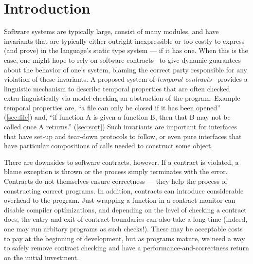 \section{Introduction}

Software systems are typically large, consist of many modules, and have invariants that are typically either outright inexpressible or too costly to express (and prove) in the language's static type system --- if it has one.
%
When this is the case, one might hope to rely on software contracts~\cite{dvanhorn:Findler2002Contracts} to give dynamic guarantees about the behavior of one's system, blaming the correct party responsible for any violation of these invariants.
%
A proposed system of \emph{temporal contracts}~\citep{ianjohnson:dfm:icfp2011} provides a linguistic mechanism to describe temporal properties that are often checked extra-linguistically via model-checking an abstraction of the program.
%
Example temporal properties are, ``a file can only be closed if it has been opened'' (\cref{sec:file}) and, ``if function A is given a function B, then that B may not be called once A returns.'' (\cref{sec:sort})
%
Such invariants are important for interfaces that have set-up and tear-down protocols to follow, or even pure interfaces that have particular compositions of calls needed to construct some object.

There are downsides to software contracts, however.
%
If a contract is violated, a blame exception is thrown or the process simply terminates with the error.
%
Contracts do not themselves ensure correctness --- they help the process of constructing correct programs.
%
In addition, contracts can introduce considerable overhead to the program.
%
Just wrapping a function in a contract monitor can disable compiler optimizations, and depending on the level of checking a contract does, the entry and exit of contract boundaries can also take a long time (indeed, one may run arbitary programs as such checks!).
%
These may be acceptable costs to pay at the beginning of development, but as programs mature, we need a way to safely remove contract checking and have a performance-and-correctness return on the initial investment.

